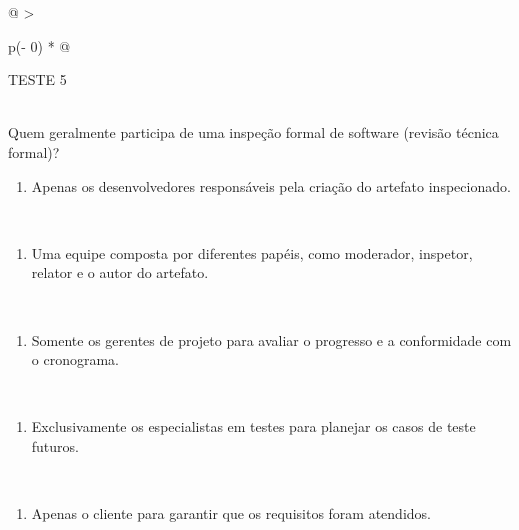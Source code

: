 \documentclass[
]{book}
\providecommand{\tightlist}{%
  \setlength{\itemsep}{0pt}\setlength{\parskip}{0pt}}
\begin{document}
\begin{longtable}[]{@{}
  >{\raggedright\arraybackslash}p{(\columnwidth - 0\tabcolsep) * }@{}}
\toprule\noalign{}
\begin{minipage}[b]{\linewidth}\raggedright
TESTE 5
\end{minipage} \\
\midrule\noalign{}
\endhead
\bottomrule\noalign{}
\endlastfoot
Quem geralmente participa de uma inspeção formal de software (revisão técnica formal)? \\
\begin{minipage}[t]{\linewidth}\raggedright
\begin{enumerate}
\def\labelenumi{\Alph{enumi})}
\tightlist
\item
  Apenas os desenvolvedores responsáveis pela criação do artefato inspecionado.
\end{enumerate}
\end{minipage} \\
\begin{minipage}[t]{\linewidth}\raggedright
\begin{enumerate}
\def\labelenumi{\Alph{enumi})}
\setcounter{enumi}{1}
\tightlist
\item
  Uma equipe composta por diferentes papéis, como moderador, inspetor, relator e o autor do artefato.
\end{enumerate}
\end{minipage} \\
\begin{minipage}[t]{\linewidth}\raggedright
\begin{enumerate}
\def\labelenumi{\Alph{enumi})}
\setcounter{enumi}{2}
\tightlist
\item
  Somente os gerentes de projeto para avaliar o progresso e a conformidade com o cronograma.
\end{enumerate}
\end{minipage} \\
\begin{minipage}[t]{\linewidth}\raggedright
\begin{enumerate}
\def\labelenumi{\Alph{enumi})}
\setcounter{enumi}{3}
\tightlist
\item
  Exclusivamente os especialistas em testes para planejar os casos de teste futuros.
\end{enumerate}
\end{minipage} \\
\begin{minipage}[t]{\linewidth}\raggedright
\begin{enumerate}
\def\labelenumi{\Alph{enumi})}
\setcounter{enumi}{4}
\tightlist
\item
  Apenas o cliente para garantir que os requisitos foram atendidos.
\end{enumerate}
\end{minipage} \\
\end{longtable}
\end{document}
